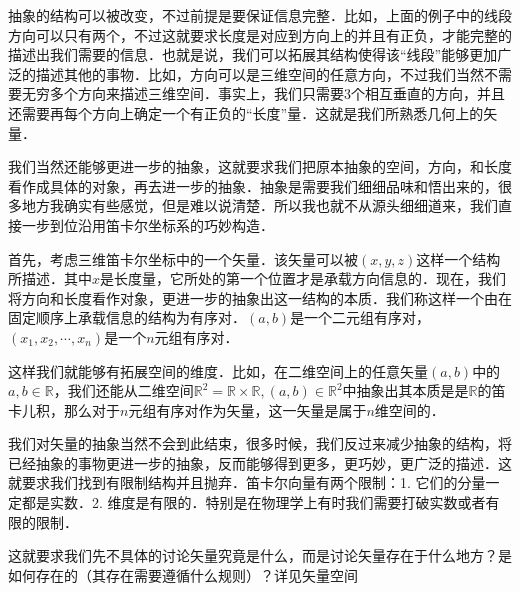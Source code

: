 抽象的结构可以被改变，不过前提是要保证信息完整．比如，上面的例子中的线段方向可以只有两个，不过这就要求长度是对应到方向上的并且有正负，才能完整的描述出我们需要的信息．也就是说，我们可以拓展其结构使得该“线段”能够更加广泛的描述其他的事物．比如，方向可以是三维空间的任意方向，不过我们当然不需要无穷多个方向来描述三维空间．事实上，我们只需要$3$个相互垂直的方向，并且还需要再每个方向上确定一个有正负的“长度”量．这就是我们所熟悉几何上的矢量．

我们当然还能够更进一步的抽象，这就要求我们把原本抽象的空间，方向，和长度看作成具体的对象，再去进一步的抽象．抽象是需要我们细细品味和悟出来的，很多地方我确实有些感觉，但是难以说清楚．所以我也就不从源头细细道来，我们直接一步到位沿用笛卡尔坐标系的巧妙构造．

首先，考虑三维笛卡尔坐标中的一个矢量．该矢量可以被$(x,y,z)$这样一个结构所描述．其中$x$是长度量，它所处的第一个位置才是承载方向信息的．现在，我们将方向和长度看作对象，更进一步的抽象出这一结构的本质．我们称这样一个由在固定顺序上承载信息的结构为有序对．$(a,b)$是一个二元组有序对，$(x_1,x_2,\cdots,x_n)$是一个$n$元组有序对．

这样我们就能够有拓展空间的维度．比如，在二维空间上的任意矢量$(a,b)$中的$a,b\in \mathbb R$，我们还能从二维空间$\mathbb R^2 = \mathbb R\times \mathbb R,(a,b)\in \mathbb R^2$中抽象出其本质是是$\mathbb R$的笛卡儿积，那么对于$n$元组有序对作为矢量，这一矢量是属于$n$维空间的．

我们对矢量的抽象当然不会到此结束，很多时候，我们反过来减少抽象的结构，将已经抽象的事物更进一步的抽象，反而能够得到更多，更巧妙，更广泛的描述．这就要求我们找到有限制结构并且抛弃．笛卡尔向量有两个限制：1. 它们的分量一定都是实数．2. 维度是有限的．特别是在物理学上有时我们需要打破实数或者有限的限制．

这就要求我们先不具体的讨论矢量究竟是什么，而是讨论矢量存在于什么地方？是如何存在的（其存在需要遵循什么规则）？详见矢量空间
